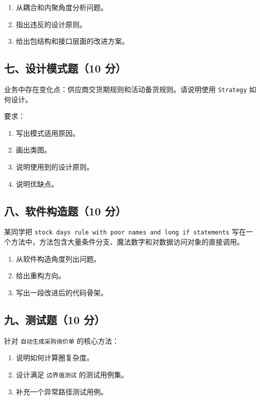 \documentclass[UTF8,zihao=-4]{ctexart}
\begin{document}
\begin{enumerate}
\item 从耦合和内聚角度分析问题。
\item 指出违反的设计原则。
\item 给出包结构和接口层面的改进方案。
\end{enumerate}


\subsection{七、设计模式题（10 分）}


业务中存在变化点：供应商交货期规则和活动备货规则。请说明使用 \texttt{Strategy} 如何设计。


要求：


\begin{enumerate}
\item 写出模式适用原因。
\item 画出类图。
\item 说明使用到的设计原则。
\item 说明优缺点。
\end{enumerate}


\subsection{八、软件构造题（10 分）}


某同学把 \texttt{stock days rule with poor names and long if statements} 写在一个方法中，方法包含大量条件分支、魔法数字和对数据访问对象的直接调用。


\begin{enumerate}
\item 从软件构造角度列出问题。
\item 给出重构方向。
\item 写出一段改进后的代码骨架。
\end{enumerate}


\subsection{九、测试题（10 分）}


针对 \texttt{自动生成采购询价单} 的核心方法：


\begin{enumerate}
\item 说明如何计算圈复杂度。
\item 设计满足 \texttt{边界值测试} 的测试用例集。
\item 补充一个异常路径测试用例。
\end{enumerate}
\end{document}
